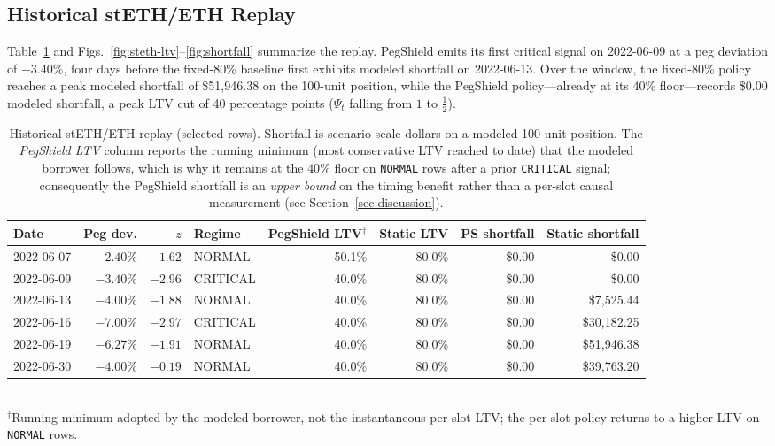 \documentclass[aps,prx,reprint,nofootinbib,longbibliography]{revtex4-2}
\begin{document}
\subsection{Historical stETH/ETH Replay}

Table~\ref{tab:replay} and Figs.~\ref{fig:steth-ltv}--\ref{fig:shortfall} summarize
the replay. PegShield emits its first critical signal on 2022-06-09 at a peg
deviation of $-3.40\%$, four days before the fixed-80\% baseline first exhibits
modeled shortfall on 2022-06-13. Over the window, the fixed-80\% policy reaches a
peak modeled shortfall of \$51{,}946.38 on the 100-unit position, while the
PegShield policy---already at its 40\% floor---records \$0.00 modeled shortfall, a
peak LTV cut of 40 percentage points ($\Psi_t$ falling from $1$ to $\tfrac12$).

\begin{table}[t]
\caption{\label{tab:replay}Historical stETH/ETH replay (selected rows). Shortfall
is scenario-scale dollars on a modeled 100-unit position. The \emph{PegShield LTV}
column reports the running minimum (most conservative LTV reached to date) that the
modeled borrower follows, which is why it remains at the $40\%$ floor on
\texttt{NORMAL} rows after a prior \texttt{CRITICAL} signal; consequently the
PegShield shortfall is an \emph{upper bound} on the timing benefit rather than a
per-slot causal measurement (see Section~\ref{sec:discussion}).}
\centering
\begin{tabular}{lrrlrrrr}
\toprule
Date & Peg dev. & $z$ & Regime & PegShield LTV$^{\dagger}$ & Static LTV & PS shortfall & Static shortfall \\
\midrule
2022-06-07 & $-2.40\%$ & $-1.62$ & NORMAL   & 50.1\% & 80.0\% & \$0.00 & \$0.00 \\
2022-06-09 & $-3.40\%$ & $-2.96$ & CRITICAL & 40.0\% & 80.0\% & \$0.00 & \$0.00 \\
2022-06-13 & $-4.00\%$ & $-1.88$ & NORMAL   & 40.0\% & 80.0\% & \$0.00 & \$7{,}525.44 \\
2022-06-16 & $-7.00\%$ & $-2.97$ & CRITICAL & 40.0\% & 80.0\% & \$0.00 & \$30{,}182.25 \\
2022-06-19 & $-6.27\%$ & $-1.91$ & NORMAL   & 40.0\% & 80.0\% & \$0.00 & \$51{,}946.38 \\
2022-06-30 & $-4.00\%$ & $-0.19$ & NORMAL   & 40.0\% & 80.0\% & \$0.00 & \$39{,}763.20 \\
\bottomrule
\end{tabular}
\\[2pt]
{\footnotesize $^{\dagger}$Running minimum adopted by the modeled borrower, not the
instantaneous per-slot LTV; the per-slot policy returns to a higher LTV on
\texttt{NORMAL} rows.}
\end{table}
\end{document}
